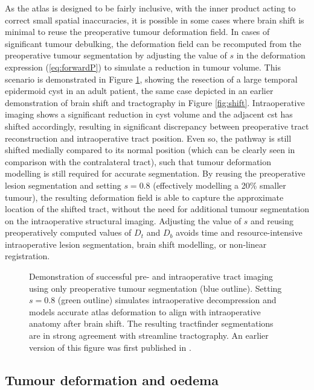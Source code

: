 As the atlas is designed to be fairly inclusive, with the inner product acting to correct small spatial inaccuracies, it is possible in some cases where brain shift is minimal to reuse the preoperative tumour deformation field.
In cases of significant tumour debulking, the deformation field can be recomputed from the preoperative tumour segmentation by adjusting the value of $s$ in the deformation expression (\ref{eq:forwardP}) to simulate a reduction in tumour volume.
This scenario is demonstrated in Figure \ref{fig:shrink}, showing the resection of a large temporal epidermoid cyst in an adult patient, the same case depicted in an earlier demonstration of brain shift and tractography in Figure \ref{fig:shift}.
Intraoperative imaging shows a significant reduction in cyst volume and the adjacent \gls{cst} has shifted accordingly, resulting in significant discrepancy between preoperative tract reconstruction and intraoperative tract position.
Even so, the pathway is still shifted medially compared to its normal position (which can be clearly seen in comparison with the contralateral tract), such that tumour deformation modelling is still required for accurate segmentation.
By reusing the preoperative lesion segmentation and setting $s=0.8$ (effectively modelling a 20\% smaller tumour), the resulting deformation field is able to capture the approximate location of the shifted tract, without the need for additional tumour segmentation on the intraoperative structural imaging.
Adjusting the value of $s$ and reusing preoperatively computed values of $D_t$ and $D_b$ avoids time and resource-intensive intraoperative lesion segmentation, brain shift modelling, or non-linear registration.

\begin{figure}[h!]
  \centering
  
  \caption[Intraoperative tumour deformation and brain shift modelling]{Demonstration of successful pre- and intraoperative tract imaging using only preoperative tumour segmentation (blue outline). Setting $s=0.8$ (green outline) simulates intraoperative decompression and models accurate atlas deformation to align with intraoperative anatomy after brain shift. The resulting  tractfinder segmentations are in strong agreement with streamline tractography. An earlier version of this figure was first published in \textcite{Young2022}.}
  \label{fig:shrink}
\end{figure}

\subsection{Tumour deformation and oedema}

